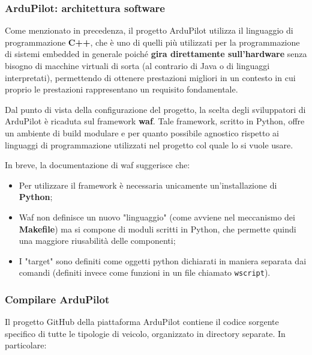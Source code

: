 \documentclass[a4paper, 12pt, oneside]{article}
\begin{document}
\subsubsection{ArduPilot: architettura software}
Come menzionato in precedenza, il progetto ArduPilot utilizza il linguaggio di programmazione \textbf{C++}, che è uno di quelli più utilizzati per la programmazione di sistemi embedded in generale poiché \textbf{gira direttamente sull'hardware} senza bisogno di macchine virtuali di sorta (al contrario di Java o di linguaggi interpretati), permettendo di ottenere prestazioni migliori in un contesto in cui proprio le prestazioni rappresentano un requisito fondamentale.

Dal punto di vista della configurazione del progetto, la scelta degli sviluppatori di ArduPilot è ricaduta sul framework \textbf{waf}. Tale framework, scritto in Python, offre un ambiente di build modulare e per quanto possibile agnostico rispetto ai linguaggi di programmazione utilizzati nel progetto col quale lo si vuole usare.

In breve, la documentazione di waf \cite{waf} suggerisce che:

\begin{itemize}
    \item Per utilizzare il framework è necessaria unicamente un'installazione di \textbf{Python};
    \item Waf non definisce un nuovo "linguaggio" (come avviene nel meccanismo dei \textbf{Makefile}) ma si compone di moduli scritti in Python, che permette quindi una maggiore riusabilità delle componenti;
    \item I "target" sono definiti come oggetti python dichiarati in maniera separata dai comandi (definiti invece come funzioni in un file chiamato \texttt{wscript}).
\end{itemize}

\subsubsection{Compilare ArduPilot}

Il progetto GitHub della piattaforma ArduPilot contiene il codice sorgente specifico di tutte le tipologie di veicolo, organizzato in directory separate\cite{ardupilot-github}. In particolare:
\end{document}
